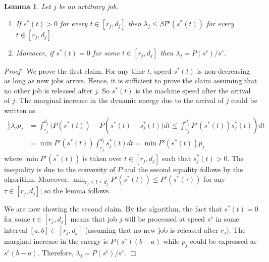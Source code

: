 \documentclass[11pt]{article}
\newenvironment{proof}{\noindent\emph{Proof\ }}{\hspace*{\fill}$\Box$\medskip}
\newtheorem{lemma}{Lemma}
\begin{document}
\begin{lemma}		\label{lem:general-energy}
Let $j$ be an arbitrary job. 
\begin{enumerate}
	\item If $s^{*}(t) > 0$ for every $t \in [r_{j},d_{j}]$ then
	$\lambda_{j} \leq \beta P'(s^{*}(t))$ 
	for every $t \in [r_{j},d_{j}]$.
	\item Moreover, if 
	$s^{*}(t) = 0$ for some $t \in [r_{j},d_{j}]$ then $\lambda_{j} = P(s^{c})/s^{c}$.
\end{enumerate}
\end{lemma}
\begin{proof}
We prove the first claim.
For any time $t$, speed $s^{*}(t)$ is non-decreasing as long as new jobs arrive. Hence,
it is sufficient to prove the claim assuming that no other job is released after $j$. So
$s^{*}(t)$ is the machine speed after the arrival of $j$. The marginal increase in the dynamic energy 
due to the arrival of $j$ could be written as 
\begin{align*}
 \frac{1}{\beta}\lambda_{j}p_{j} &= \int_{r_{j}}^{d_{j}} \biggl( P(s^{*}(t)) - P(s^{*}(t) - s^{*}_{j}(t) \biggl)dt
  	\leq   \int_{r_{j}}^{d_{j}} P'(s^{*}(t)) s^{*}_{j}(t))dt  \\
&= \min P'(s^{*}(t)) \int_{r_{j}}^{d_{j}} s^{*}_{j}(t)dt 
	  = \min P'(s^{*}(t)) p_{j}
\end{align*}
where $\min P'(s^{*}(t))$ is taken over $t \in [r_{j},d_{j}]$ such that $s^{*}_{j}(t) > 0$.
The inequality is due to the convexity of $P$ and the second equality follows by the algorithm. 
Moreover, $\min_{r_{j} \leq t \leq d_{j}} P'(s^{*}(t)) \leq P'(s^{*}(\tau))$ for any $\tau \in [r_{j},d_{j}]$; so the lemma 
follows. 

We are now showing the second claim. 
By the algorithm, the fact that $s^{*}(t) = 0$ for some $t \in [r_{j},d_{j}]$ means that
job $j$ will be processed at speed $s^{c}$ in some interval $[a,b] \subset [r_{j},d_{j}]$
(assuming that no new job is released after $r_{j}$).  
The marginal increase in the energy is $P(s^{c})(b-a)$ while $p_{j}$ could be expressed 
as $s^{c}(b-a)$. Therefore, $\lambda_{j} = P(s^{c})/s^{c}$.
\end{proof}
\end{document}
